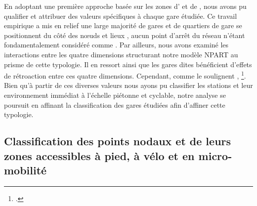 \begin{refsegment}
En adoptant une première approche basée sur les zones d' et de , nous avons pu qualifier et attribuer des valeurs spécifiques à chaque gare étudiée. Ce travail empirique a mis en relief une large majorité de gares et de quartiers de gare se positionnent du côté des nœuds et lieux , aucun point d’arrêt du réseau n’étant fondamentalement considéré comme . Par ailleurs, nous avons examiné les interactions entre les quatre dimensions structurant notre modèle \acrshort{NPART} au prisme de cette typologie. Il en ressort ainsi que les gares dites  bénéficient d’effets de rétroaction entre ces quatre dimensions. Cependant, comme le soulignent \textcolor{blue}{\textcite[4]{zhang_make_2023}}, \footnote{
     \textcolor{blue}{\autocite[4]{zhang_make_2023}}.
}. Bien qu'à partir de ces diverses valeurs nous ayons pu classifier les stations et leur environnement immédiat à l’échelle piétonne et cyclable, notre analyse se poursuit en affinant la classification des gares étudiées afin d'affiner cette typologie.%

\subsection{Classification des points nodaux et de leurs zones accessibles à pied, à vélo et en micro-mobilité
    \label{chap6:results-classification-gares}
    }


\end{refsegment}
